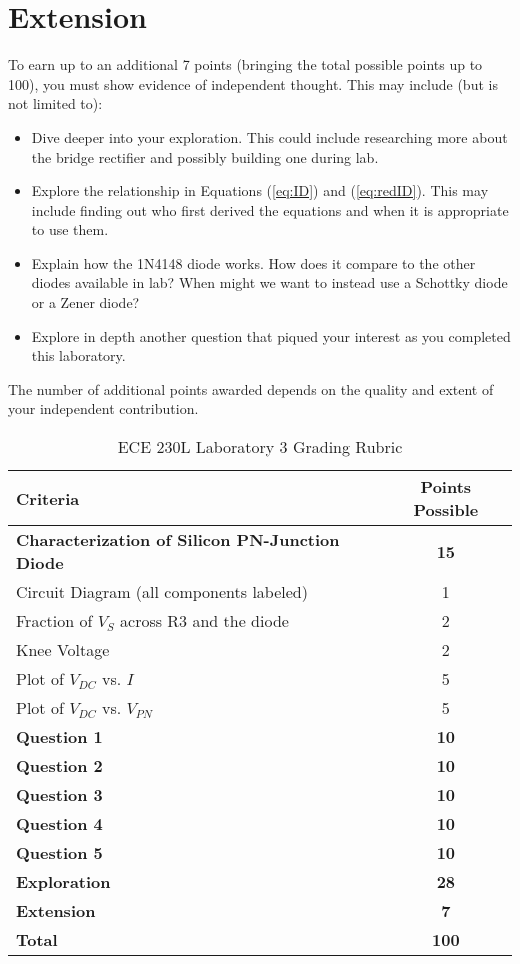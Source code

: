 \documentclass[12pt]{../manual}
\begin{document}
\newpage
\section{Extension}
To earn up to an additional 7 points (bringing the total possible points up to 100), you must show evidence of independent thought. This may include (but is not limited to):
\renewcommand\labelitemi{\textbullet}
\begin{itemize}
\item Dive deeper into your exploration. This could include researching more about the bridge rectifier and possibly building one during lab.
\item Explore the relationship in Equations (\ref{eq:ID}) and (\ref{eq:redID}). This may include finding out who first derived the equations and when it is appropriate to use them.
\item Explain how the 1N4148 diode works. How does it compare to the other diodes available in lab? When might we want to instead use a Schottky diode or a Zener diode?
\item Explore in depth another question that piqued your interest as you completed this laboratory.
\end{itemize}
The number of additional points awarded depends on the quality and extent of your independent contribution.

\newpage
{}
{}
\hspace{0pt}
\vfill %
\begin{table}[ht!]
\caption{ECE 230L Laboratory 3 Grading Rubric}
\centering
\begin{tabular}{l|c} \hline
Criteria & Points Possible \\ \hline \hline
\textbf{Characterization of Silicon PN-Junction Diode}	& \textbf{15} \\ 
Circuit Diagram (all components labeled) 				& 1 \\ 
 Fraction of $V_{S}$ across R3 and the diode			& 2 \\ 
Knee Voltage											& 2 \\ 
Plot of $V_{DC}$ vs. $I$								& 5 \\ 
Plot of $V_{DC}$ vs. $V_{PN}$									& 5 \\ \hline
\textbf{Question 1}										& \textbf{10} \\ \hline
\textbf{Question 2}										& \textbf{10} \\ \hline
\textbf{Question 3}										& \textbf{10} \\ \hline
\textbf{Question 4}										& \textbf{10} \\ \hline
\textbf{Question 5}										& \textbf{10} \\ \hline
\textbf{Exploration}									& \textbf{28} \\ \hline
\textbf{Extension}										& \textbf{7} \\ \hline \hline
\textbf{Total}											& \textbf{100} \\ \hline
\end{tabular}
\end{table}
\vfill %
\end{document}
